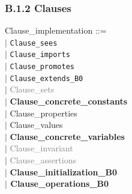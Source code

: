 \documentclass[12pt,a4paper,draft]{article}
\begin{document}
\subsubsection{B.1.2 Clauses}
\footnotesize{
\begin{sloppypar} 

Clause\_implementation ::=\\
\hspace*{0.20in} $|$ \texttt{Clause\_sees}\\
\hspace*{0.20in} $|$ \texttt{Clause\_imports}\\
\hspace*{0.20in} $|$ \texttt{Clause\_promotes}\\
\hspace*{0.20in} $|$ \texttt{Clause\_extends\_B0} \\
\hspace*{0.20in} $|$ \textcolor{gray}{Clause\_sets}\\
\hspace*{0.20in} $|$ \textbf{Clause\_concrete\_constants}\\
\hspace*{0.20in} $|$ Clause\_properties\\
\hspace*{0.20in} $|$ Clause\_values\\
\hspace*{0.20in} $|$ \textbf{Clause\_concrete\_variables}\\
\hspace*{0.20in} $|$ \textcolor{gray}{Clause\_invariant}\\
\hspace*{0.20in} $|$ \textcolor{gray}{Clause\_assertions}\\
\hspace*{0.20in} $|$ \textbf{Clause\_initialization\_B0\\
\hspace*{0.20in} $|$ Clause\_operations\_B0}\\
\end{sloppypar}}
\end{document}
